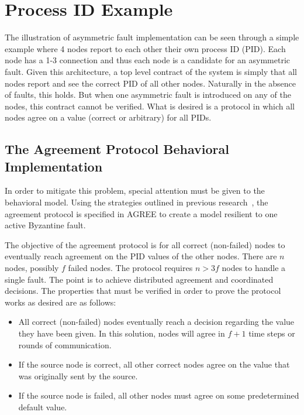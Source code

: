 \section{Process ID Example}
\label{sec:pid}
The illustration of asymmetric fault implementation can be seen through a simple example where 4 nodes report to each other their own process ID (PID). Each node has a 1-3 connection and thus each node is a candidate for an asymmetric fault. Given this architecture, a top level contract of the system is simply that all nodes report and see the correct PID of all other nodes. Naturally in the absence of faults, this holds. But when one asymmetric fault is introduced on any of the nodes, this contract cannot be verified. What is desired is a protocol in which all nodes agree on a value (correct or arbitrary) for all PIDs. 

\subsection{The Agreement Protocol Behavioral Implementation}
In order to mitigate this problem, special attention must be given to the behavioral model. Using the strategies outlined in previous research~\cite{bracha1987asynchronous,Driscoll-Byzantine-Fault}, the agreement protocol is specified in AGREE to create a model resilient to one active Byzantine fault. 

The objective of the agreement protocol is for all correct (non-failed) nodes to eventually reach agreement on the PID values of the other nodes. There are $n$ nodes, possibly $f$ failed nodes. The protocol requires $n > 3f$ nodes to handle a single fault. The point is to achieve distributed agreement and coordinated decisions.
The properties that must be verified in order to prove the protocol works as desired are as follows: 
\begin{itemize}
	\item All correct (non-failed) nodes eventually reach a decision regarding the value they have been given.  In this solution, nodes will agree in $f+1$ time steps or rounds of communication.   
	\item If the source node is correct, all other correct nodes agree on the value that was originally sent by the source.  
	\item If the source node is failed, all other nodes must agree on some predetermined default value.  
\end{itemize}

